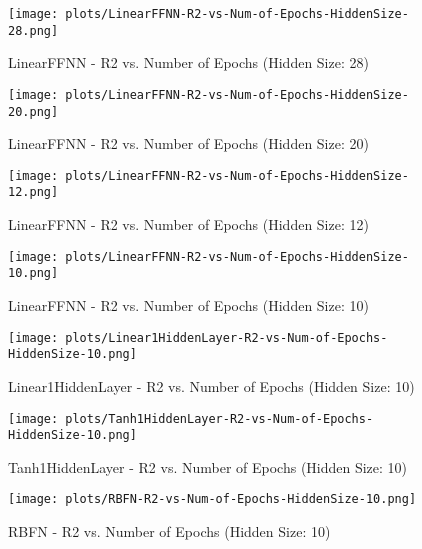 \begin{figure}[H]
    \centering
    \texttt{[image: plots/LinearFFNN-R2-vs-Num-of-Epochs-HiddenSize-28.png]}
    \caption{LinearFFNN - R2 vs. Number of Epochs (Hidden Size: 28)}
\end{figure}

\begin{figure}[H]
    \centering
    \texttt{[image: plots/LinearFFNN-R2-vs-Num-of-Epochs-HiddenSize-20.png]}
    \caption{LinearFFNN - R2 vs. Number of Epochs (Hidden Size: 20)}
\end{figure}

\begin{figure}[H]
    \centering
    \texttt{[image: plots/LinearFFNN-R2-vs-Num-of-Epochs-HiddenSize-12.png]}
    \caption{LinearFFNN - R2 vs. Number of Epochs (Hidden Size: 12)}
\end{figure}

\begin{figure}[H]
    \centering
    \texttt{[image: plots/LinearFFNN-R2-vs-Num-of-Epochs-HiddenSize-10.png]}
    \caption{LinearFFNN - R2 vs. Number of Epochs (Hidden Size: 10)}
\end{figure}

\begin{figure}[H]
    \centering
    \texttt{[image: plots/Linear1HiddenLayer-R2-vs-Num-of-Epochs-HiddenSize-10.png]}
    \caption{Linear1HiddenLayer - R2 vs. Number of Epochs (Hidden Size: 10)}
\end{figure}

\begin{figure}[H]
    \centering
    \texttt{[image: plots/Tanh1HiddenLayer-R2-vs-Num-of-Epochs-HiddenSize-10.png]}
    \caption{Tanh1HiddenLayer - R2 vs. Number of Epochs (Hidden Size: 10)}
\end{figure}

\begin{figure}[H]
    \centering
    \texttt{[image: plots/RBFN-R2-vs-Num-of-Epochs-HiddenSize-10.png]}
    \caption{RBFN - R2 vs. Number of Epochs (Hidden Size: 10)}
\end{figure}
